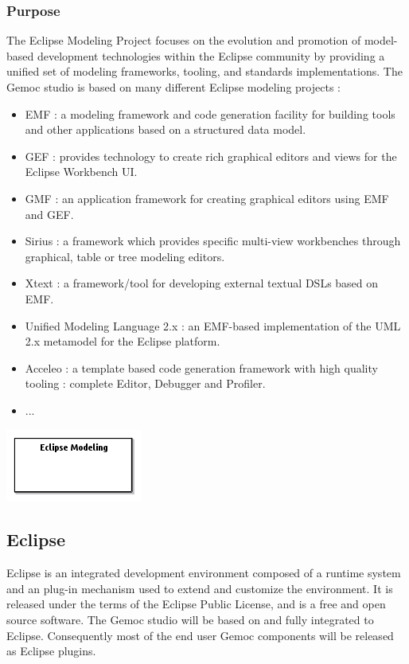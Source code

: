 \documentclass{gemoc} %
\begin{document}
\subsubsection{Purpose}
The Eclipse Modeling Project focuses on the evolution and promotion of model-based development technologies within the Eclipse community by providing a unified set of modeling frameworks, tooling, and standards implementations. The Gemoc studio is based on many different Eclipse modeling projects :
\begin{itemize}
\item EMF : a modeling framework and code generation facility for building tools and other applications based on a structured data model.
\item GEF : provides technology to create rich graphical editors and views for the Eclipse Workbench UI.
\item GMF : an application framework for creating graphical editors using EMF and GEF.
\item Sirius : a framework which provides specific multi-view workbenches through graphical, table or tree modeling editors.
\item Xtext : a framework/tool for developing external textual DSLs based on EMF.
\item Unified Modeling Language 2.x : an EMF-based implementation of the UML 2.x metamodel for the Eclipse platform.
\item Acceleo : a template based code generation framework with high quality tooling : complete Editor, Debugger and Profiler.
\item ...
\end{itemize}
\begin{center}
\includegraphics*[trim=0.0cm 0.0cm 0cm 0.0cm, clip=true]{../images/generated/Generated_Eclipse_Modeling.png}
\end{center}



\subsection{Eclipse}
Eclipse is an integrated development environment composed of a runtime system and an plug-in mechanism used to extend and customize the environment. It is released under the terms of the Eclipse Public License, and is a free and open source software. The Gemoc studio will be based on and fully integrated to Eclipse. Consequently most of the end user Gemoc components will be released as Eclipse plugins.
\end{document}
